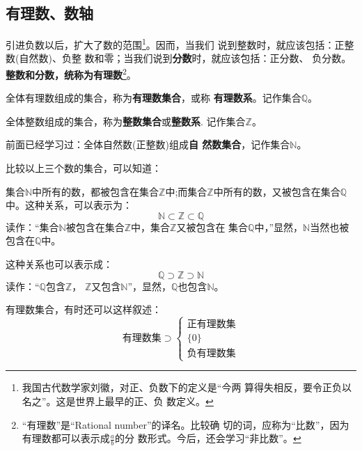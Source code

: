 \subsection{有理数、数轴}
    引进负数以后，扩大了数的范围\footnote{我国古代数学家刘徽，对正、负数下的定义是“今两
算得失相反，要令正负以名之”。这是世界上最早的正、负
数定义。}。因而，当我们
说到整数时，就应该包括：正整数(自然数)、负整
数和零；当我们说到\textbf{分数}时，就应该包括：正分数、
负分数。 \textbf{整数和分数，统称为有理数}\footnote{“有理数”是``Rational number''的译名。比较确
切的词，应称为“比数”，因为有理数都可以表示成$\frac{a}{b}$的分
数形式。今后，还会学习“非比数”。}。

全体有理数组成的集合，称为\textbf{有理数集合}，或称
\textbf{有理数系}。记作集合$\mathbb{Q}$。

    全体整数组成的集合，称为\textbf{整数集合}或\textbf{整数系}.
记作集合$\mathbb{Z}$。
\begin{center}
    \end{center}

    前面已经学习过：全体自然数(正整数)组成\textbf{自
然数集合}，记作集合$\mathbb{N}$。

    比较以上三个数的集合，可以知道：

集合$\mathbb{N}$中所有的数，都被包含在集合$\mathbb{Z}$中;而集合$\mathbb{Z}$中所有的数，又被包含在集合$\mathbb{Q}$中。这种关系，可以表示为：
\[\mathbb{N}\subset \mathbb{Z} \subset \mathbb{Q}\]       
读作：“集合$\mathbb{N}$被包含在集合$\mathbb{Z}$中，集合$\mathbb{Z}$又被包含在
集合$\mathbb{Q}$中，”显然，$\mathbb{N}$当然也被包含在$\mathbb{Q}$中。

这种关系也可以表示成：
\[\mathbb{Q}\supset \mathbb{Z} \supset \mathbb{N}\]       
读作：“$\mathbb{Q}$包含$\mathbb{Z}$，
    $\mathbb{Z}$又包含$\mathbb{N}$”，显然，$\mathbb{Q}$也包含$\mathbb{N}$。

    有理数集合，有时还可以这样叙述：
\[\text{有理数集}\supset \begin{cases}
    \text{正有理数集}\\
    \{0\}\\
    \text{负有理数集}
\end{cases} \]
    
